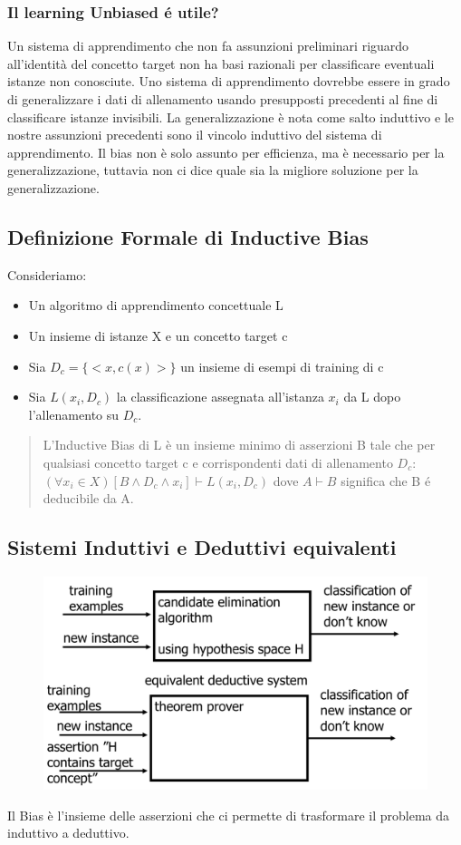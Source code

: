 \documentclass{article}
\begin{document}
\subsubsection{Il learning Unbiased é utile?}
Un sistema di apprendimento che non fa assunzioni preliminari riguardo all'identità del concetto target non ha basi razionali per classificare eventuali istanze non conosciute. Uno sistema di apprendimento dovrebbe essere in grado di generalizzare i dati di allenamento usando presupposti precedenti al fine di classificare istanze invisibili. La generalizzazione è nota come salto induttivo e le nostre assunzioni precedenti sono il vincolo induttivo del sistema di apprendimento. Il bias non è solo assunto per efficienza, ma è necessario per la generalizzazione, tuttavia non ci dice quale sia la migliore soluzione per la generalizzazione.
\subsection{Definizione Formale di Inductive Bias}
Consideriamo:
\begin{itemize}
    \item Un algoritmo di apprendimento concettuale L
    \item Un insieme di istanze X e un concetto target c
    \item Sia $D_c = \{<x, c(x)>\}$ un insieme di esempi di training di c
    \item Sia $L(x_i, D_c)$ la classificazione assegnata all'istanza $x_i$ da L dopo l'allenamento su $D_c$.
\end{itemize}
\begin{quote}
    L'Inductive Bias di L è un insieme minimo di asserzioni B tale che per qualsiasi concetto target c e corrispondenti dati di allenamento $D_c$: \newline
    $(\forall x_i \in X)[B \land D_c \land x_i] \vdash L(x_i,D_c)$ dove $A \vdash B$ significa che B é deducibile da A.
\end{quote}

\subsection{Sistemi Induttivi e Deduttivi equivalenti}
\begin{figure}[H]
    \centering
    \includegraphics[scale=0.4]{Images/sistemiinduttdedutt.png}
\end{figure}
Il Bias è l'insieme delle asserzioni che ci permette di trasformare il problema da induttivo a deduttivo.
\end{document}
